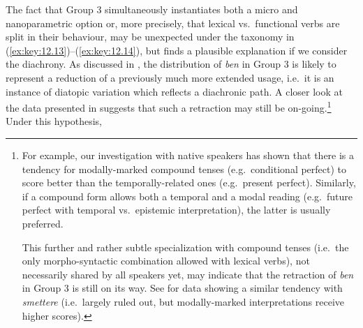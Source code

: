 \documentclass[output=paper]{langsci/langscibook}
\begin{document}
The fact that Group 3 simultaneously instantiates both a micro and
nanoparametric option or, more precisely, that lexical vs.\ functional verbs are
split in their behaviour, may be unexpected under the taxonomy in (\ref{ex:key:12.13})--(\ref{ex:key:12.14}),
but finds a plausible explanation if we consider the diachrony. As discussed in
, the distribution of \emph{ben} in Group 3 is likely to represent a
reduction of a previously much more extended usage, i.e.\ it is an instance of
diatopic variation which reflects a diachronic path. A closer look at the data
presented in \textcite{CognSchi2018b,CognSchi2018} suggests that such a
retraction may still be on-going.\footnote{For example, our investigation with
    native speakers has shown that there is a tendency for modally-marked
    compound tenses (e.g.\ conditional perfect) to score better than the
    temporally-related ones (e.g.\ present perfect).
%
%
%
Similarly, if a compound form allows both a temporal and a modal reading (e.g.\
future perfect with temporal vs.\ epistemic interpretation), the
latter is usually preferred.

%

This further and rather subtle specialization with compound tenses (i.e.\ the
only morpho-syntactic combination allowed with lexical verbs), not necessarily
shared by all speakers yet, may indicate that the retraction of \emph{ben} in
Group 3 is still on its way. See \citet{CognSchi2015} for data showing a
similar tendency with \emph{smettere} (i.e.\ largely ruled out, but
modally-marked interpretations receive higher scores).} Under this hypothesis,
\end{document}
